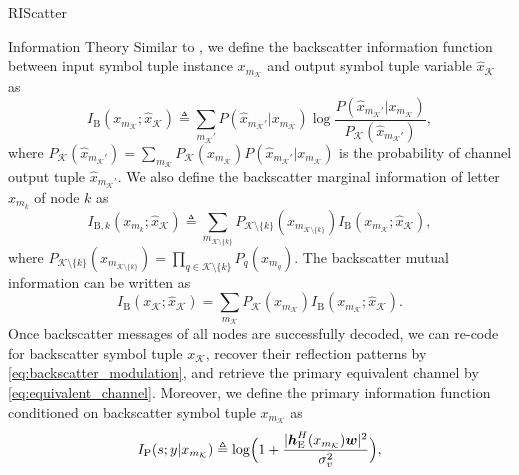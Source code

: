 \documentclass[journal]{IEEEtran}
\begin{document}
\begin{section}{RIScatter}
\begin{subsection}{Information Theory}
		Similar to \cite{Rezaeian2004}, we define the backscatter information function between input symbol tuple instance $x_{m_{\mathcal{K}}}$ and output symbol tuple variable $\hat{x}_{\mathcal{K}}$ as
		\begin{equation}
			I_{\mathrm{B}}(x_{m_{\mathcal{K}}};\hat{x}_{\mathcal{K}}) \triangleq \sum_{m_{\mathcal{K}}'} P(\hat{x}_{m_{\mathcal{K}}'}|x_{m_{\mathcal{K}}}) \log \frac{P(\hat{x}_{m_{\mathcal{K}}'}|x_{m_{\mathcal{K}}})}{P_{\mathcal{K}}(\hat{x}_{m_{\mathcal{K}}'})},
			\label{eq:backscatter_information_function}
		\end{equation}
		where $P_{\mathcal{K}}(\hat{x}_{m_{\mathcal{K}}'}) = \sum_{m_{\mathcal{K}}} P_{\mathcal{K}}(x_{m_{\mathcal{K}}}) P(\hat{x}_{m_{\mathcal{K}}'}|x_{m_{\mathcal{K}}})$ is the probability of channel output tuple $\hat{x}_{m_{\mathcal{K}}'}$.
		We also define the backscatter marginal information of letter $x_{m_k}$ of node $k$ as
		\begin{equation}
			I_{\mathrm{B},k}(x_{m_k};\hat{x}_{\mathcal{K}}) \triangleq \sum_{m_{\mathcal{K} \setminus \{k\}}} P_{\mathcal{K} \setminus \{k\}}(x_{m_{\mathcal{K} \setminus \{k\}}}) I_{\mathrm{B}}(x_{m_{\mathcal{K}}};\hat{x}_{\mathcal{K}}),
			\label{eq:backscatter_marginal_information}
		\end{equation}
		where $P_{\mathcal{K} \setminus \{k\}}(x_{m_{\mathcal{K} \setminus \{k\}}}) = \prod_{q \in \mathcal{K} \setminus \{k\}} P_{q}(x_{m_{q}})$.
		The backscatter mutual information can be written as
		\begin{equation}
			I_{\mathrm{B}}(x_{\mathcal{K}};\hat{x}_{\mathcal{K}}) = \sum_{m_{\mathcal{K}}} P_{\mathcal{K}}(x_{m_{\mathcal{K}}}) I_{\mathrm{B}}(x_{m_{\mathcal{K}}};\hat{x}_{\mathcal{K}}).
			\label{eq:backscatter_mutual_information}
		\end{equation}
		Once backscatter messages of all nodes are successfully decoded, we can re-code for backscatter symbol tuple $x_{\mathcal{K}}$, recover their reflection patterns by \eqref{eq:backscatter_modulation}, and retrieve the primary equivalent channel by \eqref{eq:equivalent_channel}.
		Moreover, we define the primary information function conditioned on backscatter symbol tuple $x_{m_{\mathcal{K}}}$ as
		\begin{equation}
			I_{\mathrm{P}}(s;y|x_{m_{\mathcal{K}}}) \triangleq \log \Bigl(1 + \frac{\lvert \boldsymbol{h}_{\mathrm{E}}^H(x_{m_{\mathcal{K}}}) \boldsymbol{w} \rvert^2}{\sigma_v^2}\Bigr),
			\label{eq:primary_information_function}
		\end{equation}

\end{subsection}
\end{section}
\end{document}
